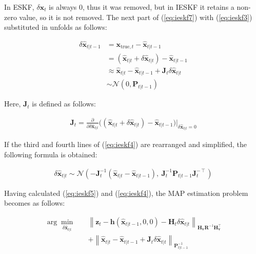 \documentclass[10pt]{article}
\begin{document}
In ESKF, $\delta \mathbf{x}_{t}$ is always 0, thus it was removed, but in IESKF it retains a non-zero value, so it is not removed. The next part of (\ref{eq:ieskf7}) with (\ref{eq:ieskf3}) substituted in unfolds as follows:

\begin{equation}  \label{eq:ieskf4}
	\begin{aligned} 
		\delta \hat{\mathbf{x}}_{t|t-1} & = \mathbf{x}_{\text{true},t} - \hat{\mathbf{x}}_{t|t-1} \\ &= (\hat{\mathbf{x}}_{t|t} + \delta \hat{\mathbf{x}}_{t|t}) - \hat{\mathbf{x}}_{t|t-1} \\ 
		& \approx \hat{\mathbf{x}}_{t|t} - \hat{\mathbf{x}}_{t|t-1} + \mathbf{J}_{t} \delta \hat{\mathbf{x}}_{t|t} \\ 
		& \sim \mathcal{N}(0, \mathbf{P}_{t|t-1})
	\end{aligned} 
\end{equation}

Here, $\mathbf{J}_{t}$ is defined as follows:

\begin{equation} 
	\begin{aligned} 
		\mathbf{J}_{t} = \frac{\partial }{\partial \delta \hat{\mathbf{x}}_{t|t}} \bigg( (\hat{\mathbf{x}}_{t|t} + \delta \hat{\mathbf{x}}_{t|t}) - \hat{\mathbf{x}}_{t|t-1} \bigg) \bigg|_{\delta \hat{\mathbf{x}}_{t|t}=0}
	\end{aligned} 
\end{equation}

If the third and fourth lines of (\ref{eq:ieskf4}) are rearranged and simplified, the following formula is obtained:

\begin{equation}  
	\begin{aligned} 
		\delta \hat{\mathbf{x}}_{t|t} \sim \mathcal{N}(-\mathbf{J}_{t}^{-1}(\hat{\mathbf{x}}_{t|t} - \hat{\mathbf{x}}_{t|t-1}), \ \mathbf{J}_{t}^{-1}\mathbf{P}_{t|t-1}\mathbf{J}_{t}^{-\intercal})
	\end{aligned} 
\end{equation}

Having calculated (\ref{eq:ieskf5}) and (\ref{eq:ieskf4}), the MAP estimation problem becomes as follows:

\begin{equation} 
	\begin{aligned} 
		\arg\min_{\delta \hat{\mathbf{x}}_{t|t}} \quad & \left\| \mathbf{z}_{t} - \mathbf{h}(\hat{\mathbf{x}}_{t|t-1}, 0, 0) - \mathbf{H}_{t} \delta\hat{\mathbf{x}}_{t|t} \right\|_{\mathbf{H}_{\mathbf{v}}\mathbf{R}^{-1}\mathbf{H}_{\mathbf{v}}^{\intercal}} \\
		& + \left\| \hat{\mathbf{x}}_{t|t} - \hat{\mathbf{x}}_{t|t-1} + \mathbf{J}_{t}\delta\hat{\mathbf{x}}_{t|t} \right\|_{\mathbf{P}_{t|t-1}^{-1}} 
	\end{aligned} 
\end{equation}
\end{document}
